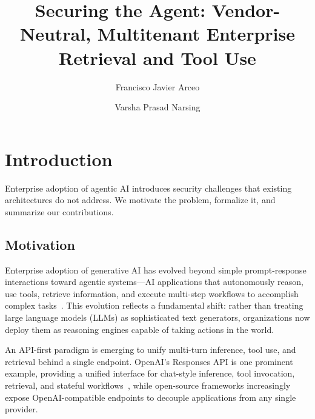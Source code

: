 \documentclass[sigconf]{acmart}
\title{Securing the Agent: Vendor-Neutral, Multitenant Enterprise Retrieval and Tool Use}
\author{Francisco Javier Arceo}
\affiliation{%
  \institution{Red Hat AI}
  \city{Boston}
  \country{USA}
}
\author{Varsha Prasad Narsing}
\affiliation{%
  \institution{Red Hat AI}
  \city{Boston}
  \country{USA}
}
\begin{document}

\maketitle

\section{Introduction}

Enterprise adoption of agentic AI introduces security challenges that existing architectures do not address. We motivate the problem, formalize it, and summarize our contributions.

\subsection{Motivation}
Enterprise adoption of generative AI has evolved beyond simple prompt-response interactions toward agentic systems---AI applications that autonomously reason, use tools, retrieve information, and execute multi-step workflows to accomplish complex tasks~\cite{yao2023react,schick2023toolformer,karpas2022mrkl}.
This evolution reflects a fundamental shift: rather than treating large language models (LLMs) as sophisticated text generators, organizations now deploy them as reasoning engines capable of taking actions in the world.

An API-first paradigm is emerging to unify multi-turn inference, tool use, and retrieval behind a single endpoint.
OpenAI's Responses API is one prominent example, providing a unified interface for chat-style inference, tool invocation, retrieval, and stateful workflows~\cite{openaiResponsesAPI}, while open-source frameworks increasingly expose OpenAI-compatible endpoints to decouple applications from any single provider.
\end{document}
